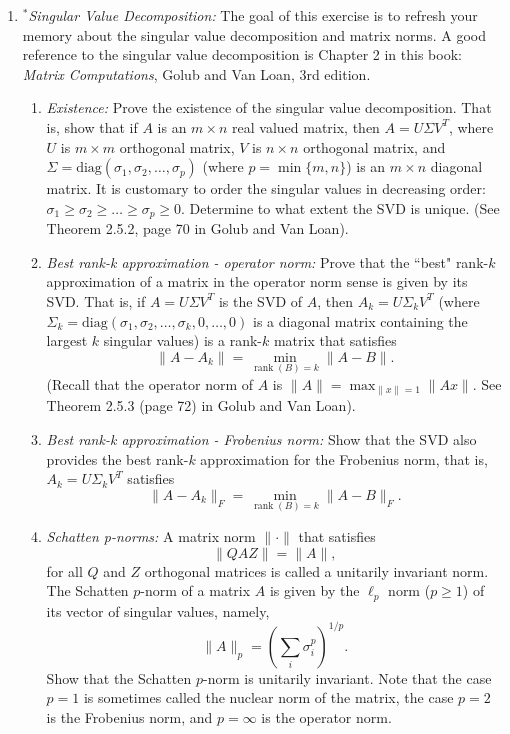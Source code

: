 \documentclass[11pt]{article}
\begin{document}
\begin{enumerate}
\item {\em $^*$Singular Value Decomposition:} The goal of this exercise is to refresh your memory about the singular value decomposition and matrix norms. A good reference to the singular value decomposition is Chapter 2 in this book:\\
{\em Matrix Computations}, Golub and Van Loan, 3rd edition.\\

\begin{enumerate}

\item {\em Existence:} Prove the existence of the singular value decomposition. That is, show that if $A$ is an $m\times n$ real valued matrix, then $A = U\Sigma V^T$, where $U$ is $m\times m$ orthogonal matrix, $V$ is $n \times n$ orthogonal matrix, and $\Sigma = \text{diag}(\sigma_1,\sigma_2,\ldots,\sigma_p)$ (where $p=\min\{m,n\}$) is an $m\times n$ diagonal matrix. It is customary to order the singular values in decreasing order: $\sigma_1 \geq \sigma_2 \geq \ldots \geq \sigma_p \geq 0$. Determine to what extent the SVD is unique. (See Theorem 2.5.2, page 70 in Golub and Van Loan).

\item {\em Best rank-k approximation - operator norm:} Prove that the ``best" rank-$k$ approximation of a matrix in the operator norm sense is given by its SVD. That is, if $A = U\Sigma V^T$ is the SVD of $A$, then $A_k = U\Sigma_k V^T$ (where $\Sigma_k = \text{diag}(\sigma_1,\sigma_2,\ldots,\sigma_k,0,\ldots,0)$ is a diagonal matrix containing the largest $k$ singular values) is a rank-$k$ matrix that satisfies
    $$\|A-A_k\| = \min_{\operatorname{rank}(B)=k} \|A-B\|.$$ (Recall that the operator norm of $A$ is $\|A\| = \max_{\|x\|=1} \|Ax\|$. See Theorem 2.5.3 (page 72) in Golub and Van Loan).

\item {\em Best rank-k approximation - Frobenius norm:} Show that the SVD also provides the best rank-$k$ approximation for the Frobenius norm, that is, $A_k = U \Sigma_k V^T$ satisfies $$\|A-A_k\|_F = \min_{\operatorname{rank}(B)=k} \|A-B\|_F.$$

\item {\em Schatten p-norms:} A matrix norm $\| \cdot \|$ that satisfies
$$\|QAZ\| = \|A\|,$$
for all $Q$ and $Z$ orthogonal matrices is called a unitarily invariant norm. The Schatten $p$-norm of a matrix $A$ is given by the $\ell_p$ norm ($p\geq 1$) of its vector of singular values, namely, $$\|A\|_p = \left(\sum_{i} \sigma_i^p\right)^{1/p}.$$ Show that the Schatten $p$-norm is unitarily invariant. Note that the case $p=1$ is sometimes called the nuclear norm of the matrix, the case $p=2$ is the Frobenius norm, and $p=\infty$ is the operator norm.


\end{enumerate}
\end{enumerate}
\end{document}
